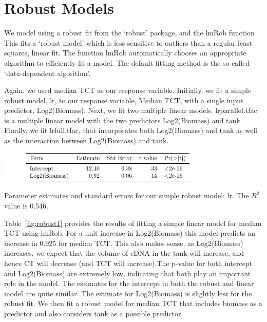 \section{Robust Models}

We model using a robust fit from the `robust' package, and the lmRob function \citep{RobustModels}. This fits a `robust model' which is less sensitive to outliers than a regular least squares, linear fit. The function lmRob automatically chooses an appropriate algorithm to efficiently fit a model.  The default fitting method is the so called `data-dependent algorithm'.

 \vspace{12pt}

 Again, we used median TCT as our response variable. Initially, we fit a simple robust model, lr, to our response variable, Median TCT, with  a single input predictor, Log2(Biomass). Next, we fit two multiple linear models. lrparallel.tfac is a multiple linear model with the two predictors Log2(Biomass) and tank. Finally, we fit  lrfull.tfac, that incorporates both Log2(Biomass) and tank as well as the interaction between Log2(Biomass) and tank. 

 \vspace{12pt}




\begin{table}[H]
\includegraphics{Chapter3Images/robust1.pdf}
\caption{\hspace{1mm}Parameter estimates and standard errors for our simple robust model: lr. The $R^{2}$ value is 0.546.}
\label{fig:robust1}
\end{table}

 Table~\ref{fig:robust1} provides the results of fitting a simple linear model for median TCT using lmRob. For a unit increase in Log2(Biomass) this model predicts an increase in 0.925 for median TCT. This also makes sense, as Log2(Biomass) increases, we expect that the volume of eDNA in the tank will increase, and hence CT will decrease (and TCT will increase).The p-value for both intercept and Log2(Biomass) are extremely low, indicating that both  play an important role in the model. The estimates for the intercept in both the robust and linear model are quite similar.  The estimate for Log2(Biomass) is slightly less for the robust fit. We then fit a robust model for median TCT that includes biomass as a predictor and also considers tank as a possible predictor.

